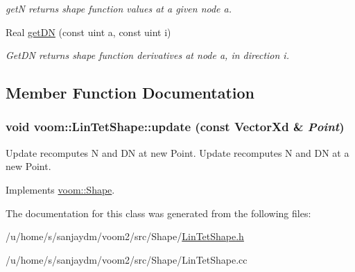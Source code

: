 \begin{DoxyCompactItemize}
\begin{DoxyCompactList}\small\item\em getN returns shape function values at a given node a. \item\end{DoxyCompactList}\item 
\hypertarget{classvoom_1_1_lin_tet_shape_a73f4e058efacab88451e81ef1832aa48}{
Real \hyperlink{classvoom_1_1_lin_tet_shape_a73f4e058efacab88451e81ef1832aa48}{getDN} (const uint a, const uint i)}
\label{classvoom_1_1_lin_tet_shape_a73f4e058efacab88451e81ef1832aa48}

\begin{DoxyCompactList}\small\item\em GetDN returns shape function derivatives at node a, in direction i. \item\end{DoxyCompactList}\end{DoxyCompactItemize}


\subsection{Member Function Documentation}
\hypertarget{classvoom_1_1_lin_tet_shape_a9a1ac89c0cfd33e4d1eb459b2d9c595e}{
\subsubsection[{update}]{\setlength{\rightskip}{0pt plus 5cm}void voom::LinTetShape::update (const VectorXd \& {\em Point})}}
\label{classvoom_1_1_lin_tet_shape_a9a1ac89c0cfd33e4d1eb459b2d9c595e}


Update recomputes N and DN at new Point. Update recomputes N and DN at a new Point. 

Implements \hyperlink{classvoom_1_1_shape_a8ded544de12647543b056cec61be9f26}{voom::Shape}.

The documentation for this class was generated from the following files:\begin{DoxyCompactItemize}
\item 
/u/home/s/sanjaydm/voom2/src/Shape/\hyperlink{_lin_tet_shape_8h}{LinTetShape.h}\item 
/u/home/s/sanjaydm/voom2/src/Shape/LinTetShape.cc\end{DoxyCompactItemize}
